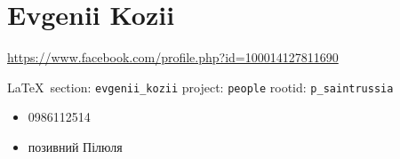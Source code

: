  
 
\section{Evgenii Kozii}
\url{https://www.facebook.com/profile.php?id=100014127811690}
  
\vspace{0.5cm}
 {\ifDEBUG\small\LaTeX~section: \verb|evgenii_kozii| project: \verb|people| rootid: \verb|p_saintrussia|	\fi}
\vspace{0.5cm}

\begin{itemize}
\item 0986112514
\item позивний Пілюля
\end{itemize}

